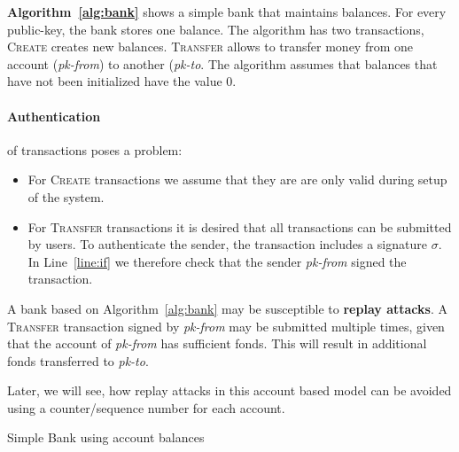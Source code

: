\textbf{Algorithm~\ref{alg:bank}} shows a simple bank that maintains balances.
For every public-key, the bank stores one balance.
The algorithm has two transactions, \textsc{Create} creates new balances.
\textsc{Transfer} allows to transfer money from one account (\textit{pk-from}) to another (\textit{pk-to}.
The algorithm assumes that balances that have not been initialized have the value 0.


\paragraph{Authentication} of transactions poses a problem:
\begin{itemize}
	\item For \textsc{Create} transactions we assume that they are are only valid during setup of the system.
	\item For \textsc{Transfer} transactions it is desired that all transactions can be submitted by users. To authenticate the sender, the transaction includes a signature $\sigma$.
	In Line~\ref{line:if} we therefore check that the sender \textit{pk-from} signed the transaction.
\end{itemize}

\noindent
A bank based on Algorithm~\ref{alg:bank} may be susceptible to \textbf{replay attacks}. A \textsc{Transfer} transaction signed by \textit{pk-from} may be submitted multiple times, given that the account of \textit{pk-from} has sufficient fonds. This will result in additional fonds transferred to \textit{pk-to}.

Later, we will see, how replay attacks in this account based model can be avoided using a counter/sequence number for each account.

\begin{algorithm}[ht!]
	\caption{Simple Bank using account balances}
	\label{alg:bank}
	\begin{algorithmic}[1]
			
			
		\EndProcedure
				\EndIf
			\EndIf
		\EndProcedure
	\end{algorithmic}
\end{algorithm}



